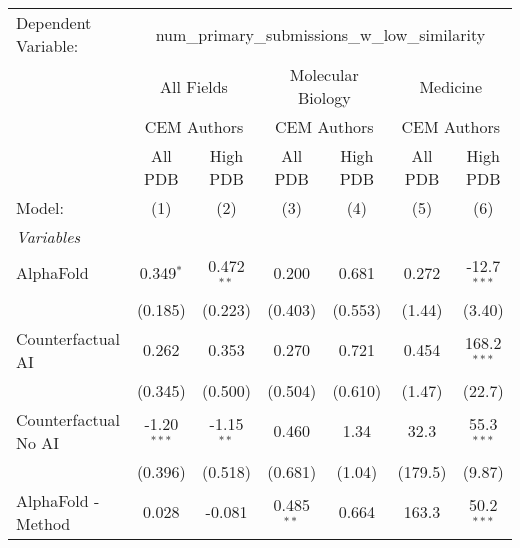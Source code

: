\begingroup
\centering
\begin{tabular}{lcccccc}
   \tabularnewline \midrule \midrule
   Dependent Variable: & \multicolumn{6}{c}{num\_primary\_submissions\_w\_low\_similarity}\\
 & \multicolumn{2}{c}{All Fields} & \multicolumn{2}{c}{Molecular Biology} & \multicolumn{2}{c}{Medicine} \\
\cmidrule(lr){2-3} \cmidrule(lr){4-5} \cmidrule(lr){6-7}
 & \multicolumn{2}{c}{CEM Authors} & \multicolumn{2}{c}{CEM Authors} & \multicolumn{2}{c}{CEM Authors} \\
\cmidrule(lr){2-3} \cmidrule(lr){4-5} \cmidrule(lr){6-7}
 & \multicolumn{1}{c}{All PDB} & \multicolumn{1}{c}{High PDB} & \multicolumn{1}{c}{All PDB} & \multicolumn{1}{c}{High PDB} & \multicolumn{1}{c}{All PDB} & \multicolumn{1}{c}{High PDB} \\
\cmidrule(lr){2-2} \cmidrule(lr){3-3} \cmidrule(lr){4-4} \cmidrule(lr){5-5} \cmidrule(lr){6-6} \cmidrule(lr){7-7}
   Model:                                                     & (1)           & (2)           & (3)           & (4)           & (5)              & (6)\\  
   \midrule
   \emph{Variables}\\
   AlphaFold                                                  & 0.349$^{*}$   & 0.472$^{**}$  & 0.200         & 0.681         & 0.272            & -12.7$^{***}$\\   
                                                              & (0.185)       & (0.223)       & (0.403)       & (0.553)       & (1.44)           & (3.40)\\   
   Counterfactual AI                                          & 0.262         & 0.353         & 0.270         & 0.721         & 0.454            & 168.2$^{***}$\\   
                                                              & (0.345)       & (0.500)       & (0.504)       & (0.610)       & (1.47)           & (22.7)\\   
   Counterfactual No AI                                       & -1.20$^{***}$ & -1.15$^{**}$  & 0.460         & 1.34          & 32.3             & 55.3$^{***}$\\   
                                                              & (0.396)       & (0.518)       & (0.681)       & (1.04)        & (179.5)          & (9.87)\\   
   AlphaFold - Method                                         & 0.028         & -0.081        & 0.485$^{**}$  & 0.664         & 163.3            & 50.2$^{***}$\\   

\end{tabular}
